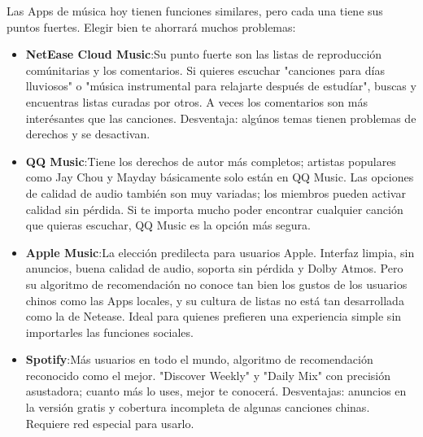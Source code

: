 


Las Apps de música hoy tienen funciones similares, pero cada una tiene sus puntos fuertes. Elegir bien te ahorrará muchos problemas:

\begin{itemize}
  \item \textbf{NetEase Cloud Music}:Su punto fuerte son las listas de reproducción comúnitarias y los comentarios. Si quieres escuchar "canciones para días lluviosos" o "música instrumental para relajarte después de estudíar", buscas y encuentras listas curadas por otros. A veces los comentarios son más interésantes que las canciones. Desventaja: algúnos temas tienen problemas de derechos y se desactivan.
  \item \textbf{QQ Music}:Tiene los derechos de autor más completos; artistas populares como Jay Chou y Mayday básicamente solo están en QQ Music. Las opciones de calidad de audio también son muy variadas; los miembros pueden activar calidad sin pérdida. Si te importa mucho poder encontrar cualquier canción que quieras escuchar, QQ Music es la opción más segura.
  \item \textbf{Apple Music}:La elección predilecta para usuarios Apple. Interfaz limpia, sin anuncios, buena calidad de audio, soporta sin pérdida y Dolby Atmos. Pero su algoritmo de recomendación no conoce tan bien los gustos de los usuarios chinos como las Apps locales, y su cultura de listas no está tan desarrollada como la de Netease. Ideal para quienes prefieren una experiencia simple sin importarles las funciones sociales.
  \item \textbf{Spotify}:Más usuarios en todo el mundo, algoritmo de recomendación reconocido como el mejor. "Discover Weekly" y "Daily Mix" con precisión asustadora; cuanto más lo uses, mejor te conocerá. Desventajas: anuncios en la versión gratis y cobertura incompleta de algunas canciones chinas. Requiere red especial para usarlo.
\end{itemize}

